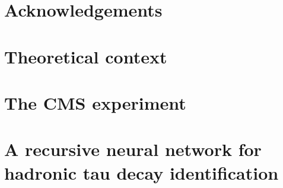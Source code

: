 \documentclass[12pt,twoside]{report}
\begin{document}

    


    \chapter*{Acknowledgements}

    {\hypersetup{linkcolor=black}
        \tableofcontents
        \listoffigures
        \listoftables
    }
        {\hypersetup{linkcolor=mycolor}}
    
%     
     
    \chapter{Theoretical context}
    \label{sec:TheoryChapter}
    

    \chapter{The CMS experiment}
    \label{sec:CMSchapter}
    
    
 \chapter{A recursive neural network for hadronic tau decay identification}%
 \label{sec:RECNNchapter}
 
    
%     
    
\end{document}
